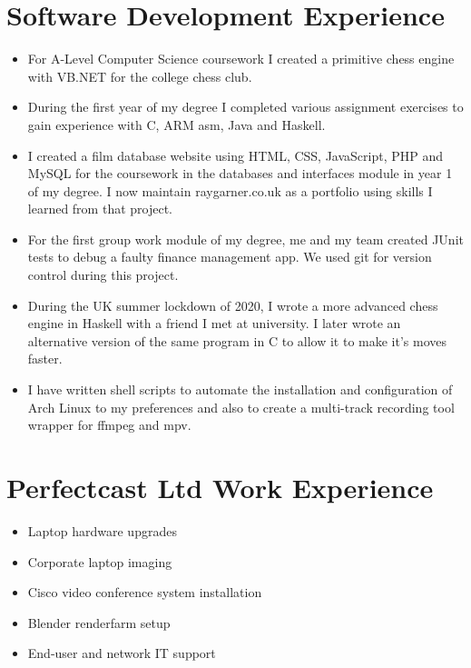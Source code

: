 \documentclass{article}
\begin{document}
\section{Software Development Experience}

\begin{itemize}[noitemsep]

\renewcommand{\labelitemi}{$\square$}
\item For A-Level Computer Science coursework I created a primitive chess engine with VB.NET for the college chess club.
\item During the first year of my degree I completed various assignment exercises to gain experience with C, ARM asm, Java and Haskell.
\item I created a film database website using HTML, CSS, JavaScript, PHP and MySQL for the coursework in the databases and interfaces module in year 1 of my degree. I now maintain raygarner.co.uk as a portfolio using skills I learned from that project.
\item For the first group work module of my degree, me and my team created JUnit tests to debug a faulty finance management app. We used git for version control during this project.
\item During the UK summer lockdown of 2020, I wrote a more advanced chess engine in Haskell with a friend I met at university. I later wrote an alternative version of the same program in C to allow it to make it's moves faster.
\item I have written shell scripts to automate the installation and configuration of Arch Linux to my preferences and also to create a multi-track recording tool wrapper for ffmpeg and mpv.

\end{itemize}




\section{Perfectcast Ltd Work Experience}


\begin{itemize}[noitemsep]

\renewcommand{\labelitemi}{$\square$}
\item Laptop hardware upgrades
\item Corporate laptop imaging
\item Cisco video conference system installation
\item Blender renderfarm setup
\item End-user and network IT support

\end{itemize}
\end{document}
